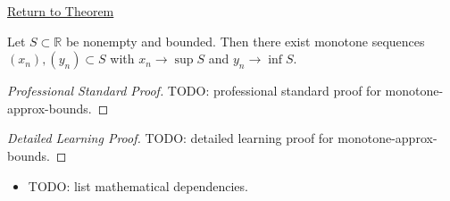 \newpage
{}
\label{prf:monotone-approx-bounds}

\begin{remark*}[Return]
\hyperref[prop:monotone-approx-bounds]{Return to Theorem}
\end{remark*}

\begin{theorem*}
Let $S\subset\mathbb{R}$ be nonempty and bounded. Then there exist
monotone sequences $(x_n),(y_n)\subset S$ with
$x_n\to\sup S$ and $y_n\to\inf S$.
\end{theorem*}

\begin{proof}[Professional Standard Proof]
\LRAProofBodyStart
TODO: professional standard proof for monotone-approx-bounds.
\end{proof}

\begin{proof}[Detailed Learning Proof]
\LRAProofBodyStart
TODO: detailed learning proof for monotone-approx-bounds.
\end{proof}

\begin{remark*}
\end{remark*}

\begin{dependencies}
\begin{itemize}
  \item TODO: list mathematical dependencies.
\end{itemize}
\end{dependencies}

\clearpage
